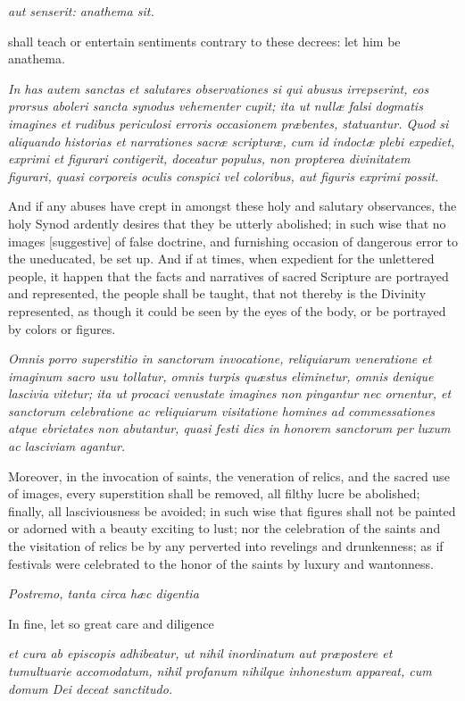 \emph{aut senserit: anathema sit.}

shall teach or entertain sentiments contrary to these decrees: let him be anathema.

\emph{In has autem sanctas et salutares observationes si qui abusus irrepserint, eos prorsus aboleri sancta synodus vehementer cupit; ita ut nullæ falsi dogmatis imagines et rudibus periculosi erroris occasionem præbentes, statuantur. Quod si aliquando historias et narrationes sacræ scripturæ, cum id indoctæ plebi expediet, exprimi et figurari contigerit, doceatur populus, non propterea divinitatem figurari, quasi corporeis oculis conspici vel coloribus, aut figuris exprimi possit.}

And if any abuses have crept in amongst these holy and salutary observances, the holy Synod ardently desires that they be utterly abolished; in such wise that no images [suggestive] of false doctrine, and furnishing occasion of dangerous error to the uneducated, be set up. And if at times, when expedient for the unlettered people, it happen that the facts and narratives of sacred Scripture are portrayed and represented, the people shall be taught, that not thereby is the Divinity represented, as though it could be seen by the eyes of the body, or be portrayed by colors or figures.

\emph{Omnis porro superstitio in sanctorum invocatione, reliquiarum veneratione et imaginum sacro usu tollatur, omnis turpis quæstus eliminetur, omnis denique lascivia vitetur; ita ut procaci venustate imagines non pingantur nec ornentur, et sanctorum celebratione ac reliquiarum visitatione homines ad commessationes atque ebrietates non abutantur, quasi festi dies in honorem sanctorum per luxum ac lasciviam agantur.}

Moreover, in the invocation of saints, the veneration of relics, and the sacred use of images, every superstition shall be removed, all filthy lucre be abolished; finally, all lasciviousness be avoided; in such wise that figures shall not be painted or adorned with a beauty exciting to lust; nor the celebration of the saints and the visitation of relics be by any perverted into revelings and drunkenness; as if festivals were celebrated to the honor of the saints by luxury and wantonness.

\emph{Postremo, tanta circa hæc digentia }

In fine, let so great care and diligence

\emph{et cura ab episcopis adhibeatur, ut nihil inordinatum aut præpostere et tumultuarie accomodatum, nihil profanum nihilque inhonestum appareat, cum domum Dei deceat sanctitudo.}

